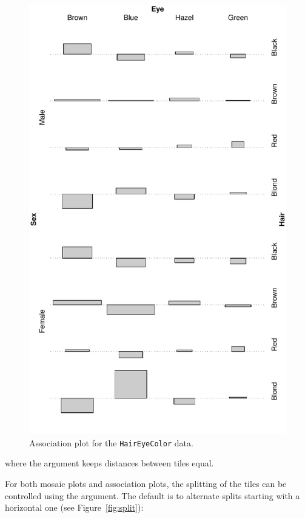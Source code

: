 \documentclass{Z}
\newcommand{\data}[1]{\texttt{#1}}
\begin{document}
\begin{figure}[p]
\begin{center}
\includegraphics{strucplot-Residualsfig}
\caption{Association plot for the \data{HairEyeColor} data.}
\label{fig:residuals}
\end{center}
\end{figure}

\noindent where the  argument keeps distances between tiles
equal.

For both mosaic plots and association plots, 
the splitting of the tiles can be controlled using the
 argument. The default is to alternate splits starting
with a horizontal one (see Figure~\ref{fig:split}):
\end{document}
